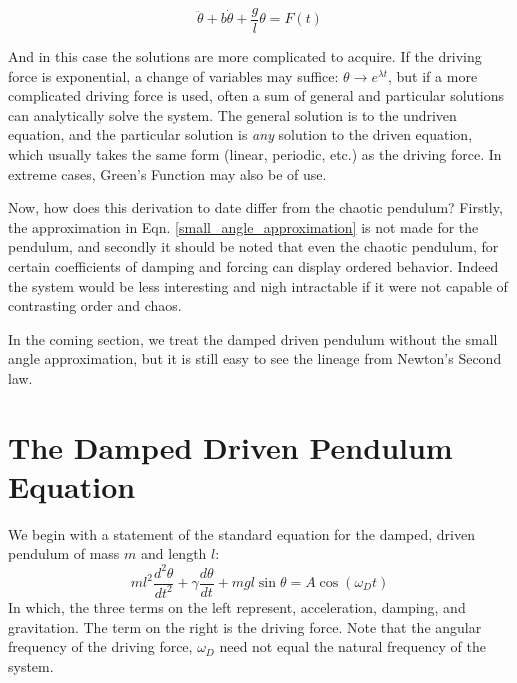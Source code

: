 \documentclass[aps,pre,nofootinbib]{revtex4}
\begin{document}
\begin{equation}
\label{damped_driven_harmonic_oscillator}
 \ddot{\theta} +  b \dot{\theta} + \frac{g}{l}\theta = F(t)
\end{equation}

And in this case the solutions are more complicated to acquire.  If the driving force is exponential, a change of variables may suffice: $\theta \rightarrow e^{\lambda t}$, but if a more complicated driving force is used, often a sum of general and particular solutions can analytically solve the system.  The general solution is to the undriven equation, and the particular solution is \textit{any} solution to the driven equation, which usually takes the same form (linear, periodic, etc.) as the driving force.  In extreme cases, Green's Function may also be of use.  

Now, how does this derivation to date differ from the chaotic pendulum?  Firstly, the approximation in Eqn. \eqref{small_angle_approximation} is not made for the pendulum, and secondly it should be noted that even the chaotic pendulum, for certain coefficients of damping and forcing can display ordered behavior.  Indeed the system would be less interesting and nigh intractable if it were not capable of contrasting order and chaos.  

In the coming section, we treat the damped driven pendulum without the small angle approximation, but it is still easy to see the lineage from Newton's Second law.  


\section{The Damped Driven Pendulum Equation}
We begin with a statement of the standard equation for the damped, driven pendulum of mass $m$  and length $l$:
\begin{equation}
\label{damped_driven_pendulum}
ml^2 \frac{d^2\theta}{dt^2} + \gamma \frac{d \theta}{dt} + mgl \sin{\theta} = A \cos{(\omega_D t)}
\end{equation}
In which, the three terms on the left represent, acceleration, damping, and gravitation.  The term on the right is the driving force. Note that the angular frequency of the driving force, $\omega_D$ need not equal the natural frequency of the system.  
\end{document}
